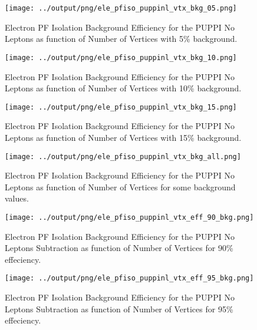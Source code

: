 \documentclass[11pt]{book}
\begin{document}
\begin{figure}[htb]
\centering
\texttt{[image: ../output/png/ele\_pfiso\_puppinl\_vtx\_bkg\_05.png]}
\caption{Electron PF Isolation Background Efficiency for the PUPPI No Leptons as function of Number of Vertices with 5\% background.}
\label{fig:ele_pfiso_vtx_bkg_puppinl_bkg_05}
\end{figure}

\begin{figure}[htb]
\centering
\texttt{[image: ../output/png/ele\_pfiso\_puppinl\_vtx\_bkg\_10.png]}
\caption{Electron PF Isolation Background Efficiency for the PUPPI No Leptons as function of Number of Vertices with 10\% background.}
\label{fig:ele_pfiso_vtx_bkg_puppinl_bkg_10}
\end{figure}

\begin{figure}[htb]
\centering
\texttt{[image: ../output/png/ele\_pfiso\_puppinl\_vtx\_bkg\_15.png]}
\caption{Electron PF Isolation Background Efficiency for the PUPPI No Leptons as function of Number of Vertices with 15\% background.}
\label{fig:ele_pfiso_vtx_bkg_puppinl_bkg_15}
\end{figure}

\begin{figure}[htb]
\centering
\texttt{[image: ../output/png/ele\_pfiso\_puppinl\_vtx\_bkg\_all.png]}
\caption{Electron PF Isolation Background Efficiency for the PUPPI No Leptons as function of Number of Vertices for some background values.}
\label{fig:ele_pfiso_vtx_bkg_puppinl_bkg_all}
\end{figure}

\begin{figure}[htb]
\centering
\texttt{[image: ../output/png/ele\_pfiso\_puppinl\_vtx\_eff\_90\_bkg.png]}
\caption{Electron PF Isolation Background Efficiency for the PUPPI No Leptons Subtraction as function of Number of Vertices for 90\% effeciency.}
\label{fig:ele_pfiso_vtx_eff_puppinl_eff_90_bkg}
\end{figure}

\begin{figure}[htb]
\centering
\texttt{[image: ../output/png/ele\_pfiso\_puppinl\_vtx\_eff\_95\_bkg.png]}
\caption{Electron PF Isolation Background Efficiency for the PUPPI No Leptons Subtraction as function of Number of Vertices for 95\% effeciency.}
\label{fig:ele_pfiso_vtx_eff_puppinl_eff_95_bkg}
\end{figure}
\end{document}
